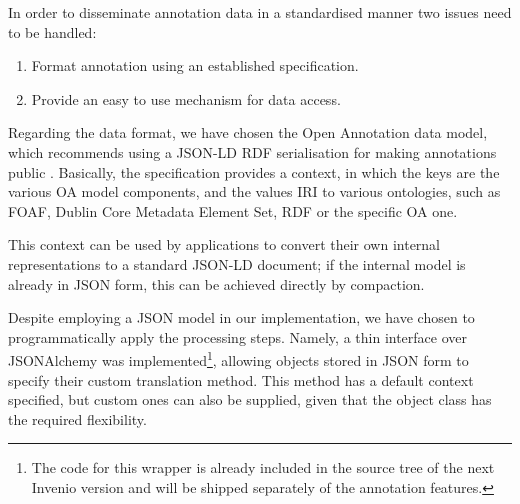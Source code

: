 
In order to disseminate annotation data in a standardised manner two issues
need to be handled:
\begin{enumerate}
  \item Format annotation using an established specification.
  \item Provide an easy to use mechanism for data access.
\end{enumerate}

Regarding the data format, we have chosen the Open Annotation data model, which
recommends using a JSON-LD RDF serialisation for making annotations public
\cite{ref:oa}. Basically, the specification provides a context, in which the
keys are the various OA model components, and the values IRI to various
ontologies, such as FOAF, Dublin Core Metadata Element Set, RDF or the specific
OA one.

This context can be used by applications to convert their own internal
representations to a standard JSON-LD document; if the internal model is
already in JSON form, this can be achieved directly by compaction.

Despite employing a JSON model in our implementation, we have chosen to
programmatically apply the processing steps. Namely, a thin interface over
JSONAlchemy was implemented\footnote{The code for this wrapper is already
included in the source tree of the next Invenio version and will be shipped
separately of the annotation features.}, allowing objects stored in JSON form
to specify their custom translation method. This method has a default context
specified, but custom ones can also be supplied, given that the object class
has the required flexibility.

